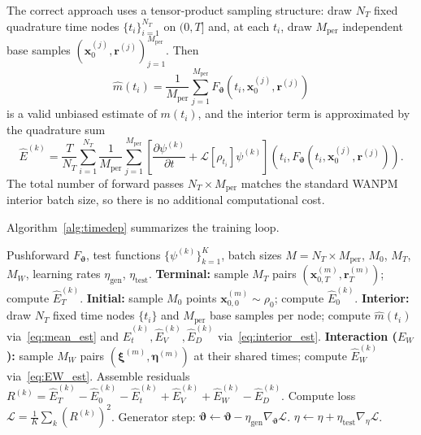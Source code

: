 \documentclass[12pt]{article}
\newcommand{\bx}{\mathbf{x}}
\newcommand{\br}{\mathbf{r}}
\newcommand{\bxi}{\boldsymbol{\xi}}
\newcommand{\bfeta}{\boldsymbol{\eta}}
\newcommand{\vth}{\boldsymbol{\vartheta}}
\newcommand{\Lop}{\mathcal{L}}
\newcommand{\hatm}{\hat{m}}
\newcommand{\hatE}{\widehat{E}}
\theoremstyle{plain}
\begin{document}
The correct approach uses a tensor-product sampling structure: draw $N_T$ fixed
quadrature time nodes $\{t_i\}_{i=1}^{N_T}$ on $(0,T]$ and, at each $t_i$, draw
$M_\mathrm{per}$ independent base samples $(\bx_0^{(j)},\br^{(j)})_{j=1}^{M_\mathrm{per}}$.
Then
\begin{equation}
  \hatm(t_i) = \frac{1}{M_\mathrm{per}}\sum_{j=1}^{M_\mathrm{per}}
    F_{\vth}\!\left(t_i,\bx_0^{(j)},\br^{(j)}\right)
  \label{eq:mean_est}
\end{equation}
is a valid unbiased estimate of $m(t_i)$, and the interior term is approximated by the
quadrature sum
\begin{equation}
  \hatE^{(k)} = \frac{T}{N_T}\sum_{i=1}^{N_T}\frac{1}{M_\mathrm{per}}
    \sum_{j=1}^{M_\mathrm{per}}
    \left[\frac{\partial\psi^{(k)}}{\partial t} + \Lop[\rho_{t_i}]\psi^{(k)}\right]
    \!\left(t_i, F_{\vth}(t_i,\bx_0^{(j)},\br^{(j)})\right).
  \label{eq:interior_est}
\end{equation}
The total number of forward passes $N_T\times M_\mathrm{per}$ matches the standard
WANPM interior batch size, so there is no additional computational cost.

Algorithm~\ref{alg:timedep} summarizes the training loop.

\begin{algorithm}[h]
\caption{WANPM for the McKean--Vlasov Equation (Time-Dependent)}
\label{alg:timedep}
\begin{algorithmic}[1]
\Require Pushforward $F_{\vth}$, test functions $\{{\psi}^{(k)}\}_{k=1}^K$,
batch sizes $M=N_T\times M_\mathrm{per}$, $M_0$, $M_T$, $M_W$,
learning rates $\eta_\mathrm{gen}$, $\eta_\mathrm{test}$.
  \State \textbf{Terminal:} sample $M_T$ pairs $(\bx_{0,T}^{(m)},\br_T^{(m)})$;
    compute $\hatE_T^{(k)}$.
  \State \textbf{Initial:} sample $M_0$ points $\bx_{0,0}^{(m)}\sim\rho_0$;
    compute $\hatE_0^{(k)}$.
  \State \textbf{Interior:} draw $N_T$ fixed time nodes $\{t_i\}$ and
    $M_\mathrm{per}$ base samples per node;
    compute $\hatm(t_i)$ via~\eqref{eq:mean_est} and
    $\hatE_t^{(k)},\hatE_V^{(k)},\hatE_D^{(k)}$ via~\eqref{eq:interior_est}.
  \State \textbf{Interaction ($E_W$):} sample $M_W$ pairs
    $(\bxi^{(m)},\bfeta^{(m)})$ at their shared times; compute $\hatE_W^{(k)}$ via~\eqref{eq:EW_est}.
  \State Assemble residuals $R^{(k)}=\hatE_T^{(k)}-\hatE_0^{(k)}-\hatE_t^{(k)}+\hatE_V^{(k)}+\hatE_W^{(k)}-\hatE_D^{(k)}$.
  \State Compute loss $\mathcal{L}=\frac{1}{K}\sum_k(R^{(k)})^2$.
  \State Generator step: $\vth\leftarrow\vth-\eta_\mathrm{gen}\nabla_{\vth}\mathcal{L}$.
    \State $\eta\leftarrow\eta+\eta_\mathrm{test}\nabla_{\eta}\mathcal{L}$.
  \EndIf
\EndFor
\end{algorithmic}
\end{algorithm}
\end{document}
